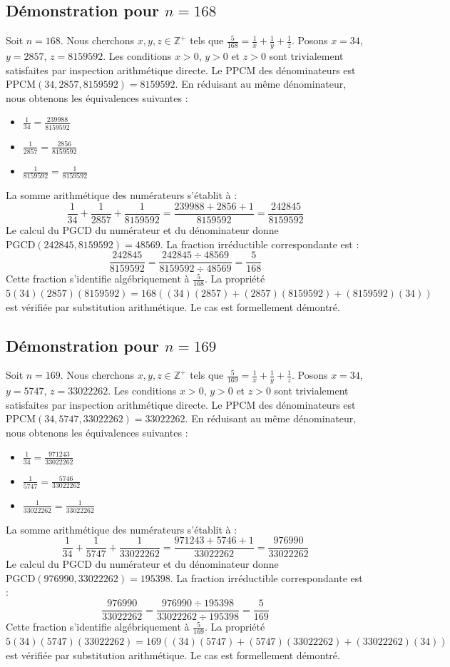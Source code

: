 \documentclass[12pt,a4paper]{article}
\begin{document}
\subsection{Démonstration pour $n = 168$}
Soit $n = 168$. Nous cherchons $x, y, z \in \mathbb{Z}^{+}$ tels que $\frac{5}{168} = \frac{1}{x} + \frac{1}{y} + \frac{1}{z}$.
Posons $x = 34$, $y = 2857$, $z = 8159592$.
Les conditions $x > 0$, $y > 0$ et $z > 0$ sont trivialement satisfaites par inspection arithmétique directe.
Le PPCM des dénominateurs est $\text{PPCM}(34, 2857, 8159592) = 8159592$.
En réduisant au même dénominateur, nous obtenons les équivalences suivantes :
\begin{itemize}
    \item $\frac{1}{34} = \frac{239988}{8159592}$
    \item $\frac{1}{2857} = \frac{2856}{8159592}$
    \item $\frac{1}{8159592} = \frac{1}{8159592}$
\end{itemize}
La somme arithmétique des numérateurs s'établit à :
$$ \frac{1}{34} + \frac{1}{2857} + \frac{1}{8159592} = \frac{239988 + 2856 + 1}{8159592} = \frac{242845}{8159592} $$
Le calcul du PGCD du numérateur et du dénominateur donne $\text{PGCD}(242845, 8159592) = 48569$.
La fraction irréductible correspondante est :
$$ \frac{242845}{8159592} = \frac{242845 \div 48569}{8159592 \div 48569} = \frac{5}{168} $$
Cette fraction s'identifie algébriquement à $\frac{5}{168}$.
La propriété $5(34)(2857)(8159592) = 168((34)(2857) + (2857)(8159592) + (8159592)(34))$ est vérifiée par substitution arithmétique.
Le cas est formellement démontré.

\subsection{Démonstration pour $n = 169$}
Soit $n = 169$. Nous cherchons $x, y, z \in \mathbb{Z}^{+}$ tels que $\frac{5}{169} = \frac{1}{x} + \frac{1}{y} + \frac{1}{z}$.
Posons $x = 34$, $y = 5747$, $z = 33022262$.
Les conditions $x > 0$, $y > 0$ et $z > 0$ sont trivialement satisfaites par inspection arithmétique directe.
Le PPCM des dénominateurs est $\text{PPCM}(34, 5747, 33022262) = 33022262$.
En réduisant au même dénominateur, nous obtenons les équivalences suivantes :
\begin{itemize}
    \item $\frac{1}{34} = \frac{971243}{33022262}$
    \item $\frac{1}{5747} = \frac{5746}{33022262}$
    \item $\frac{1}{33022262} = \frac{1}{33022262}$
\end{itemize}
La somme arithmétique des numérateurs s'établit à :
$$ \frac{1}{34} + \frac{1}{5747} + \frac{1}{33022262} = \frac{971243 + 5746 + 1}{33022262} = \frac{976990}{33022262} $$
Le calcul du PGCD du numérateur et du dénominateur donne $\text{PGCD}(976990, 33022262) = 195398$.
La fraction irréductible correspondante est :
$$ \frac{976990}{33022262} = \frac{976990 \div 195398}{33022262 \div 195398} = \frac{5}{169} $$
Cette fraction s'identifie algébriquement à $\frac{5}{169}$.
La propriété $5(34)(5747)(33022262) = 169((34)(5747) + (5747)(33022262) + (33022262)(34))$ est vérifiée par substitution arithmétique.
Le cas est formellement démontré.
\end{document}
